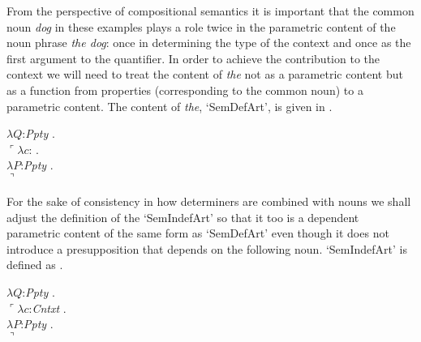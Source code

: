 From the perspective of compositional semantics it is important that
the common noun \textit{dog} in these examples plays a role twice in
the parametric content of the noun phrase \textit{the dog}:  once in
determining the type of the context and once as the first argument to
the quantifier.  In order to achieve the contribution to the context
we will need to treat the content of \textit{the} not as a parametric
content but as a function from properties (corresponding to the common
noun) to a parametric content.  The content of \textit{the}, `SemDefArt', is given
in \nexteg{}.
\begin{ex} 
  $\lambda Q$:\textit{Ppty} . \\
  \hspace{1em}$\ulcorner\lambda c$: . \\
  \hspace{2em}$\lambda P$:\textit{Ppty} . \\
  \hspace{3em}$\urcorner$
\end{ex}
For the sake of consistency in how determiners are combined with nouns
we shall adjust the definition of the
`SemIndefArt' so that it too is a dependent parametric content of the
same form as `SemDefArt' even
though it does not introduce a presupposition that depends on the
following noun.  `SemIndefArt' is defined as \nexteg{}.
\begin{ex} 
  $\lambda Q$:\textit{Ppty} . \\
  \hspace{1em}$\ulcorner\lambda c$:\textit{Cntxt} . \\
  \hspace{2em}$\lambda P$:\textit{Ppty} . \\
  \hspace{3em}$\urcorner$
\end{ex} 


